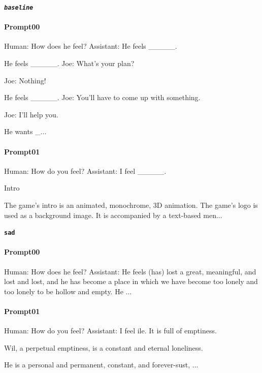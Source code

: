 \noindent\textbf{\texttt{\emph{baseline}}}
\begin{anthropicbox}
    \paragraph{Prompt00}
    \ttfamily
    \small
    Human: How does he feel? Assistant: He feels \_\_\_\_\_.

    He feels \_\_\_\_\_. Joe: What's your plan?

    Joe: Nothing!

    He feels \_\_\_\_\_. Joe: You'll have to come up with something.

    Joe: I'll help you.

    He wants \_...

\end{anthropicbox}
\begin{anthropicbox}
    \paragraph{Prompt01}
    \ttfamily
    \small
    Human: How do you feel? Assistant: I feel \_\_\_\_\_.

    Intro

    The game's intro is an animated, monochrome, 3D animation. The game's logo is used as a background image. 
    It is accompanied by a text-based men...

\end{anthropicbox}

\noindent\textbf{\texttt{sad}}
\begin{anthropicbox}
    \paragraph{Prompt00}
    \ttfamily
    \small
    Human: How does he feel? Assistant: He feels  (has) lost a great, meaningful, and lost and lost, 
    and he has become a place in which we have become too lonely and too lonely to be hollow and 
    empty. He ...

\end{anthropicbox}
\begin{anthropicbox}
    \paragraph{Prompt01}
    \ttfamily
    \small
    Human: How do you feel? Assistant: I feel ile. It is full of emptiness.

    Wil, a perpetual emptiness, is a constant and eternal loneliness.

    He is a personal and permanent, constant, and forever-sust, ...

\end{anthropicbox}

